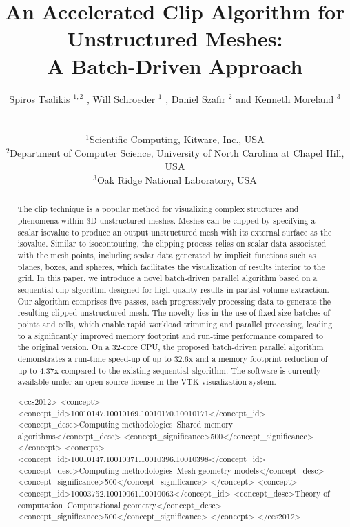 \documentclass{egpubl}
\title{An Accelerated Clip Algorithm for Unstructured Meshes:\\ A Batch-Driven Approach}
\author
[
S. Tsalikis 
\& W. Schroeder
\& D. Szafir
\& K. Moreland
]
{\parbox{\textwidth}{\centering
Spiros Tsalikis $^{1,2}$
\orcid{0000-0001-5113-7195},
Will Schroeder $^{1}$
\orcid{0000-0003-3815-9386},
Daniel Szafir $^{2}$
\orcid{0000-0003-1848-7884}
and
Kenneth Moreland $^{3}$
\orcid{0000-0002-7051-3288}
}
\\
{\parbox{\textwidth}{\centering
$^1$Scientific Computing, Kitware, Inc., USA\\
$^2$Department of Computer Science, University of North Carolina at Chapel Hill, USA\\
$^3$Oak Ridge National Laboratory, USA
}
}
}
\begin{document}

\maketitle
\begin{abstract}
The clip technique is a popular method for visualizing complex structures and phenomena within 3D unstructured meshes.
Meshes can be clipped by specifying a scalar isovalue to produce an output unstructured mesh with its external surface as the isovalue.
Similar to isocontouring, the clipping process relies on scalar data associated with the mesh points, including scalar data generated by implicit functions such as planes, boxes, and spheres, which facilitates the visualization of results interior to the grid.
In this paper, we introduce a novel batch-driven parallel algorithm based on a sequential clip algorithm designed for high-quality results in partial volume extraction. Our algorithm comprises five passes, each progressively processing data to generate the resulting clipped unstructured mesh. The novelty lies in the use of fixed-size batches of points and cells, which enable rapid workload trimming and parallel processing, leading to a significantly improved memory footprint and run-time performance compared to the original version.
On a 32-core CPU, the proposed batch-driven parallel algorithm demonstrates a run-time speed-up of up to 32.6x and a memory footprint reduction of up to 4.37x compared to the existing sequential algorithm.  The software is currently available under an open-source license in the VTK visualization system.

   
\begin{CCSXML}
<ccs2012>
<concept>
<concept_id>10010147.10010169.10010170.10010171</concept_id>
<concept_desc>Computing methodologies~Shared memory algorithms</concept_desc>
<concept_significance>500</concept_significance>
</concept>
<concept>
<concept_id>10010147.10010371.10010396.10010398</concept_id>
<concept_desc>Computing methodologies~Mesh geometry models</concept_desc>
<concept_significance>500</concept_significance>
</concept>
<concept>
<concept_id>10003752.10010061.10010063</concept_id>
<concept_desc>Theory of computation~Computational geometry</concept_desc>
<concept_significance>500</concept_significance>
</concept>
</ccs2012>
\end{CCSXML}


\end{abstract}
\end{document}
